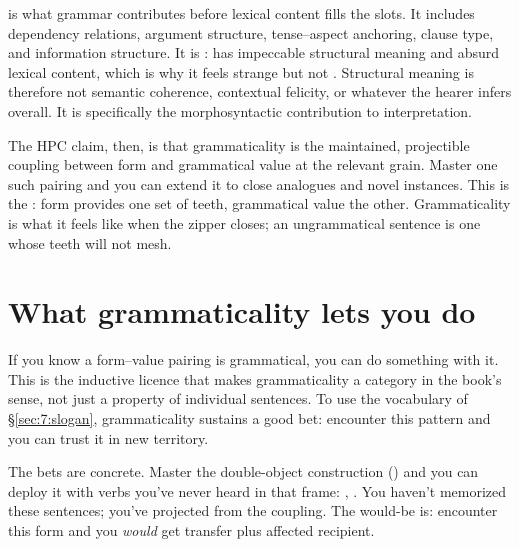  is what grammar contributes before lexical content fills the slots. It includes dependency relations, argument structure, tense--aspect anchoring, clause type, and information structure. It is :  has impeccable structural meaning and absurd lexical content, which is why it feels strange but not . Structural meaning is therefore not semantic coherence, contextual felicity, or whatever the hearer infers overall. It is specifically the morphosyntactic contribution to interpretation.

The HPC claim, then, is that grammaticality is the maintained, projectible coupling between form and grammatical value at the relevant grain. Master one such pairing and you can extend it to close analogues and novel instances. This is the : form provides one set of teeth, grammatical value the other. Grammaticality is what it feels like when the zipper closes; an ungrammatical sentence is one whose teeth will not mesh.


\section{What grammaticality lets you do}
\label{sec:14:projectibility}

If you know a form--value pairing is grammatical, you can do something with it. This is the inductive licence that makes grammaticality a category in the book's sense, not just a property of individual sentences. To use the vocabulary of §\ref{sec:7:slogan}, grammaticality sustains a good bet: encounter this pattern and you can trust it in new territory.

The bets are concrete. Master the double-object construction () and you can deploy it with verbs you've never heard in that frame: , . You haven't memorized these sentences; you've projected from the coupling. The would-be is: encounter this form and you \emph{would} get transfer plus affected recipient.

